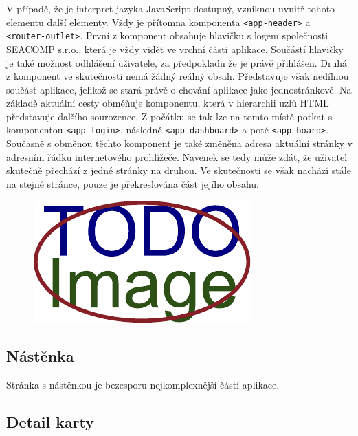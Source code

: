 V případě, že je interpret jazyka JavaScript dostupný, vzniknou uvnitř tohoto elementu další elementy. Vždy je přítomna komponenta \texttt{<app-header>} a \texttt{<router-outlet>}. První z komponent obsahuje hlavičku s logem společnosti SEACOMP s.r.o., která je vždy vidět ve vrchní části aplikace. Součástí hlavičky je také možnost odhlášení uživatele, za předpokladu že je právě přihlášen.
Druhá z komponent ve skutečnosti nemá žádný reálný obsah. Představuje však nedílnou součást aplikace, jelikož se stará právě o chování aplikace jako jednostránkové. Na základě aktuální cesty obměňuje komponentu, která v hierarchii uzlů HTML představuje dalšího sourozence. Z počátku se tak lze na tomto místě potkat s komponentou \texttt{<app-login>}, následně \texttt{<app-dashboard>} a poté \texttt{<app-board>}. Současně s obměnou těchto komponent je také změněna adresa aktuální stránky v adresním řádku internetového prohlížeče. Navenek se tedy může zdát, že uživatel skutečně přechází z jedné stránky na druhou. Ve skutečnosti se však nachází stále na stejné stránce, pouze je překreslována část jejího obsahu.

\begin{figure}[H]
	\centering
	\includegraphics[width=\textwidth]{obrazky-figures/placeholder.pdf}
\end{figure}


\subsection{Nástěnka}
Stránka s nástěnkou je bezesporu nejkomplexnější částí aplikace.

\subsection{Detail karty}

